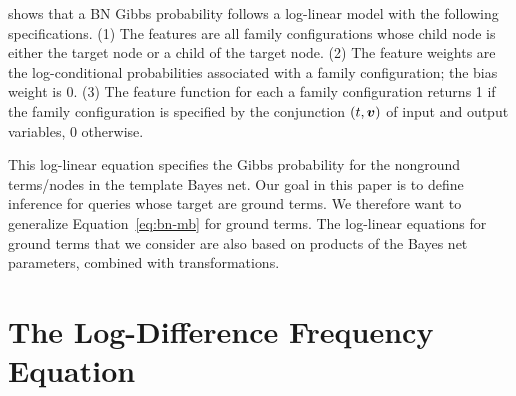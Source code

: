 \documentclass[runningheads,a4paper]{llncs}
\begin{document}
\noindent shows that a BN Gibbs probability follows a log-linear model with the following specifications. (1) The features are all family configurations whose child node is either the target node or a child of the target node. (2) The feature weights are the log-conditional probabilities associated with a family configuration; the bias weight is 0. (3) The feature function for each a family configuration returns 1 if the family configuration is specified by the conjunction $(\TV,\VTuple)$ of input and output variables, 0 otherwise. 

This log-linear equation specifies the Gibbs probability for the nonground terms/nodes in the template Bayes net. Our goal in this paper is to define inference for queries whose target are ground terms. We therefore want to generalize Equation~\eqref{eq:bn-mb} for ground terms. The log-linear equations for ground terms that we consider are also based on products of the Bayes net parameters, combined with transformations. 



\section{The Log-Difference Frequency Equation} 
\label{sec:theequation}
\end{document}
